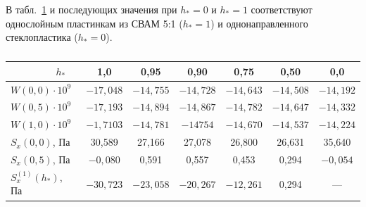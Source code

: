 В табл.~\ref{ned:tab:2} и последующих значения при $h_*=0$ и $h_*=1$ соответствуют однослойным пластинкам из СВАМ 5:1 ($h_*=1$) и однонаправленного стеклопластика ($h_*=0$).




\begin{table}[b!]

\centering

\small 

\caption{\label{ned:tab:2}}

\vspace{-3mm}

\setlength{\extrarowheight}{1pt}

\setlength{\tabcolsep}{8pt}

\begin{tabular}{l|c|c|c|c|c|c}

\hline

~~~~~~~~\footnotesize $h_{*}$ & \footnotesize 1,0 & \footnotesize 0,95 & \footnotesize 0,90 & \footnotesize 0,75 & \footnotesize 0,50 & \footnotesize 0,0\\

\hline

\rule{0mm}{14pt}%

$W(0,0)\cdot 10^9$ & $-17,048$ & $-14,755$ & $-14,728$ & $-14,643$ & $-14,508$ & $-14,192$\\


$W(0,5)\cdot 10^9$ & $-17,193$ & $-14,894$ & $-14,867$ & $-14,782$ & $-14,647$ & $-14,332$\\


$W(1,0) \cdot 10^9$ & $-1,7103$ & $-14,781$ & $-14754$ & $-14,670$ & $-14,537$ & $-14,224$\\


$S_x(0,0)$, Па & 30,589 & 27,166 & 27,078 & 26,800 & 26,631 & 35,640\\


$S_x(0,5)$, Па & $-0,080$ & 0,591 & 0,557 & 0,453 & 0,294 & $-0,054$\\


$S_x^{(1)}(h_*)$, Па & $-30,723$ & $-23,058$ & $-20,267$ & $-12,261$ & 0,294 & ---\\

%


\end{tabular}
\end{table}
